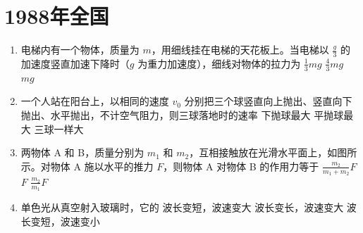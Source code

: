 \documentclass[\gkver]{gaokaozhenti}
\begin{document}
\chapter{1988年全国}

\begin{enumerate}
\item
电梯内有一个物体，质量为 $m$，用细线挂在电梯的天花板上。当电梯以 $\frac{g}{3}$ 的加速度竖直加速下降时（$g$ 为重力加速度），细线对物体的拉力为
{$\frac{1}{3}mg$}
{$\frac{4}{3}mg$}
{$mg$}


\item
一个人站在阳台上，以相同的速度 $v_{0}$ 分别把三个球竖直向上抛出、竖直向下抛出、水平抛出，不计空气阻力，则三球落地时的速率
{下抛球最大}
{平抛球最大}
{三球一样大}


\item
两物体 A 和 B，质量分别为 $m_{1}$ 和 $m_{2}$，互相接触放在光滑水平面上，如图所示。对物体 A 施以水平的推力 $F$，则物体 A 对物体 B 的作用力等于
\onepicture[w=4.07cm]{}
{$\frac{m_{2}}{m_{1}+m_{2}}F$}
{$F$}
{$\frac{m_{2}}{m_{1}}F$}


\item
单色光从真空射入玻璃时，它的
{波长变短，波速变大}
{波长变长，波速变大}
{波长变短，波速变小}


\end{enumerate}
\end{document}

